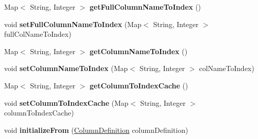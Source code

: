 \begin{DoxyCompactItemize}
\item 
\mbox{\label{classcom_1_1mysql_1_1cj_1_1result_1_1_default_column_definition_a49d89dc5bfb3818140db790571278aa1}} 
Map$<$ String, Integer $>$ {\bfseries get\+Full\+Column\+Name\+To\+Index} ()
\item 
\mbox{\label{classcom_1_1mysql_1_1cj_1_1result_1_1_default_column_definition_ae2045059ad696f24e150f350d78bf78f}} 
void {\bfseries set\+Full\+Column\+Name\+To\+Index} (Map$<$ String, Integer $>$ full\+Col\+Name\+To\+Index)
\item 
\mbox{\label{classcom_1_1mysql_1_1cj_1_1result_1_1_default_column_definition_a0062f342092aed8730976bb8d3cb1a83}} 
Map$<$ String, Integer $>$ {\bfseries get\+Column\+Name\+To\+Index} ()
\item 
\mbox{\label{classcom_1_1mysql_1_1cj_1_1result_1_1_default_column_definition_ab28ab9fcc3e8ca10cbc6c0bc511efa29}} 
void {\bfseries set\+Column\+Name\+To\+Index} (Map$<$ String, Integer $>$ col\+Name\+To\+Index)
\item 
\mbox{\label{classcom_1_1mysql_1_1cj_1_1result_1_1_default_column_definition_a76daa3a615b1036aafa51dc1c02d2cba}} 
Map$<$ String, Integer $>$ {\bfseries get\+Column\+To\+Index\+Cache} ()
\item 
\mbox{\label{classcom_1_1mysql_1_1cj_1_1result_1_1_default_column_definition_a8c6cb26318321620cc702e53a480d28f}} 
void {\bfseries set\+Column\+To\+Index\+Cache} (Map$<$ String, Integer $>$ column\+To\+Index\+Cache)
\item 
\mbox{\label{classcom_1_1mysql_1_1cj_1_1result_1_1_default_column_definition_a3f43ae53d1b938644d8c737c2ab07940}} 
void {\bfseries initialize\+From} (\mbox{\hyperlink{interfacecom_1_1mysql_1_1cj_1_1protocol_1_1_column_definition}{Column\+Definition}} column\+Definition)
\item 

\end{DoxyCompactItemize}
